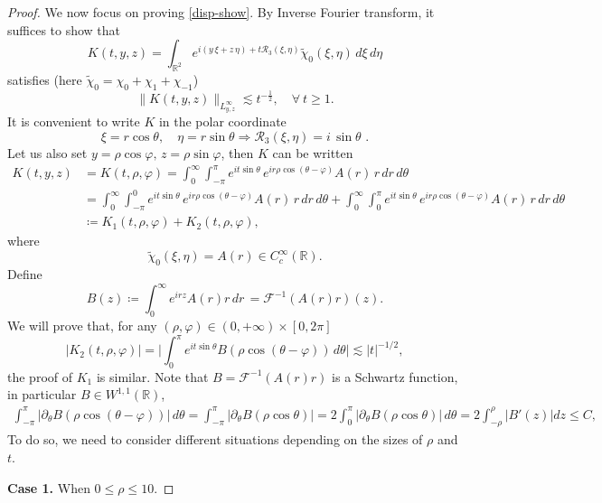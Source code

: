 \documentclass[10pt,a4paper]{amsart}
\newcommand \tri {\coloneqq}
\newcommand\R{{\mathbb R}}
\newcommand{\beqs}{\begin{equation*}}
\newcommand{\beq}{\begin{equation}}
\newcommand{\eeqs}{\end{equation*}}
\newcommand{\eeq}{\end{equation}}
\begin{document}
\begin{proof}
	We now focus on proving \eqref{disp-show}. By Inverse Fourier transform, it suffices to show that
	\[
	K(t, y,z) = \int_{\mathbb{R}^2} e^{i  (y\,\xi + z\,\eta) + t \mathcal{R}_3(\xi, \eta)} \tilde{\chi}_0(\xi, \eta) \, d\xi \, d\eta
	\]
	satisfies (here $ \tilde{\chi}_0={\chi}_0+{\chi}_1+{\chi}_{-1}$)
	\[
	\| K(t,y,z) \|_{L^\infty_{y,z}} \lesssim t^{-\frac{1}{2}}, \quad \forall~ t\geq 1.
	\]
	It is convenient to write $K$ in the polar coordinate
	\[
	\xi = r \cos \theta, \quad \eta = r \sin \theta \Rightarrow \mathcal{R}_3(\xi, \eta) = i\,\sin \theta\,\,.
	\]
	Let us also set \( y = \rho \cos \varphi, \, z = \rho \sin \varphi \), then $K$ can be written
	\begin{align*}
		K(t,y,z)&=K(t,\rho,\varphi) 
		= \int_0^\infty \int_{-\pi}^{\pi} e^{i t \sin \theta} \, e^{i r  %
			\rho \cos (\theta-\varphi)} A(r) \, r \, dr \, d\theta\\
		&=\int_0^\infty \int_{-\pi}^{0} e^{i t \sin \theta} \, e^{i r  \rho \cos (\theta-\varphi)} A(r) \, r \, dr \, d\theta+\int_0^\infty \int_{0}^{\pi} e^{i t \sin \theta} \, e^{i r  \rho \cos (\theta-\varphi)} A(r) \, r \, dr \, d\theta\\
		&\tri  K_{1}(t, \rho, \varphi)+K_{2}(t,\rho, \varphi),
	\end{align*}
	where 
	\beqs
	\tilde{\chi}_0(\xi,\eta)= A(r) \in  C_c^{\infty}(\mathbb{R}).
	\eeqs
	Define
	\[
	B(z) \tri \int_0^\infty e^{i r  z} A(r) r \, dr\,=\mathcal{F}^{-1}(A(r) r)(z).
	\]
	We will prove that, %
    for any $(\rho,\varphi)\in (0,+\infty)\times [0,2\pi]$
	\beq\label{es-K2}
	|K_2(t, \rho,\varphi)|=\bigg|\int_{0}^{\pi} e^{it \sin\theta}B(\rho \cos (\theta-\varphi))\, d\theta\bigg| \lesssim |t|^{-1/2},
	\eeq
	the proof of $K_1$ is similar. Note that $B=\mathcal{F}^{-1}(A(r) r)$ is a Schwartz function, in particular $B\in W^{1,1}(\R)$,
\begin{align*}
		\int_{-\pi}^{\pi} |\partial_{\theta}B(\rho \cos (\theta-\varphi))|\, d\theta=\int_{-\pi}^{\pi} |\partial_{\theta}B(\rho \cos \theta)|=2\int_{0}^{\pi} |\partial_{\theta}B(\rho \cos \theta)|\, d\theta=2\int_{-\rho}^{\rho}|B'(z)|dz\leq C, 
	\end{align*}
    To do so, we need to consider different situations depending on the sizes of $\rho$ and $t.$
	
	\textbf{Case 1.} When \( 0\leq \rho \leq 10 \). 
	

\end{proof}
\end{document}
